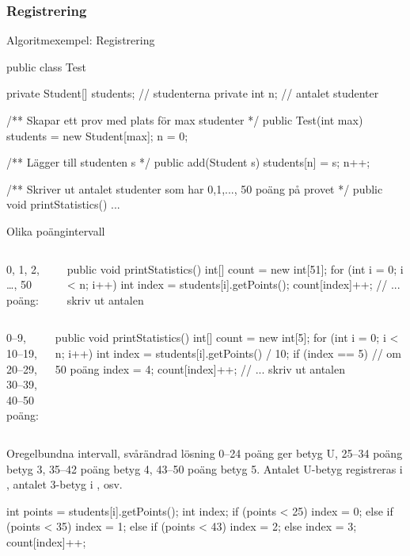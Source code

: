 \documentclass{lecturenotes}
\begin{document}
\subsubsection{Registrering}
\begin{Slide}{Algoritmexempel: Registrering}


\begin{Code}
public class Test {
    private Student[] students; // studenterna
    private int n;              // antalet studenter

    /** Skapar ett prov med plats för max studenter */
    public Test(int max) {
        students = new Student[max];
        n = 0;
    }
    
    /** Lägger till studenten s */
    public add(Student s) {
        students[n] = s;
        n++;
    }
    
    /** Skriver ut antalet studenter som har 0,1,...,
        50 poäng på provet */
    public void printStatistics() { ... }
}
\end{Code}
\end{Slide} 

\begin{Slide}{Olika poängintervall}
\lstset{xleftmargin=0mm}

\begin{columns}
\column{2cm}
0, 1, 2, \ldots, 50 poäng:
\column{8cm}
\begin{Code}
public void printStatistics() {
    int[] count = new int[51];
    for (int i = 0; i < n; i++) {
        int index = students[i].getPoints();
        count[index]++;
    }
    // ... skriv ut antalen                       
}
\end{Code}
\end{columns}

\begin{columns}
\column{2cm}
0--9, 10--19,\\ 20--29, 30--39, \\40--50 poäng:
\column{8cm}
\begin{Code}
public void printStatistics() {
    int[] count = new int[5];
    for (int i = 0; i < n; i++) {
        int index = students[i].getPoints() / 10;
        if (index == 5) { // om 50 poäng
            index = 4;
        }
        count[index]++;
    }
    // ... skriv ut antalen  
}
\end{Code}
\end{columns}
\lstset{xleftmargin=\parindent}
\end{Slide} 

\begin{Slide}{Oregelbundna intervall, svårändrad lösning}
0--24 poäng ger betyg U, 25--34 poäng betyg 3, 35--42 poäng betyg 4, 43--50 poäng betyg 5. Antalet U-betyg registreras i , antalet 3-betyg i , osv.
\begin{Code}
int points = students[i].getPoints();
int index;
if (points < 25) {
    index = 0;
} else if (points < 35) {
    index = 1;
} else if (points < 43) {
    index = 2;
} else {
    index = 3;
}
count[index]++;
\end{Code}
\end{Slide} 
\end{document}
